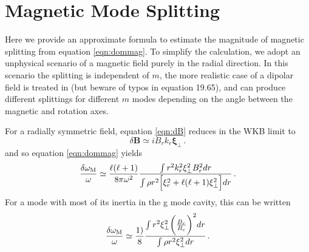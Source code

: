 \appendix

\section{Magnetic Mode Splitting}
\label{magmode}

Here we provide an approximate formula to estimate the magnitude of magnetic splitting from equation \ref{eqn:dommag}. To simplify the calculation, we adopt an unphysical scenario of a magnetic field purely in the radial direction. In this scenario the splitting is independent of $m$, the more realistic case of a dipolar field is treated in \cite{Unno_1989} (but beware of typos in equation 19.65), and can produce different splittings for different $m$ modes depending on the angle between the magnetic and rotation axes.

For a radially symmetric field, equation \ref{eqn:dB} reduces in the WKB limit to 
\begin{equation}
\delta {\boldsymbol B} \simeq i B_r k_r \boldsymbol{\xi}_\perp \, .
\end{equation}
and so equation \ref{eqn:dommag} yields
\begin{equation}
\label{eqn:dommag2}
\frac{\delta \omega_{\rm M}}{\omega} \simeq \frac{\ell(\ell+1)}{8 \pi \omega^2 } \frac{\int r^2 k_r^2 \xi_\perp^2 B_r^2 d r }{\int  \rho r^2 \Big[ \xi_r^2 + \ell(\ell+1) \xi_\perp^2 \Big] d r }\, .
\end{equation}
For a mode with most of its inertia in the g mode cavity, this can be written 
\begin{equation}
\label{eqn:dommag2}
\frac{\delta \omega_{\rm M}}{\omega} \simeq \frac{1)}{8} \frac{\int r^2 \xi_\perp^2 \bigg(\frac{B_r}{B_c}\bigg)^2 d r }{\int  \rho r^2 \xi_\perp^2 d r }\, .
\end{equation}